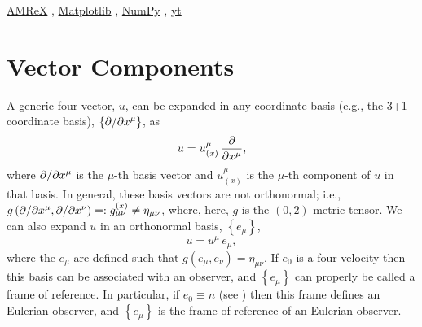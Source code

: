 \href{https://amrex-codes.github.io/}{AMReX}
\citep{zab2019},
\href{https://matplotlib.org/}{Matplotlib}
\citep{h2007},
\href{http://www.numpy.org/}{NumPy}
\citep{hmw2020},
\href{https://yt-project.org/}{yt}
\citep{tso2011}

\appendix

\section{Vector Components}

A generic four-vector, $u$, can be expanded in any coordinate basis
(e.g., the 3+1 coordinate basis),
$\left\{\partial/\partial x^{\mu}\right\}$, as
\begin{equation}
  u=u_{\left(x\right)}^{\mu}\,\frac{\partial}{\partial x^{\mu}},
\end{equation}
where $\partial/\partial x^{\mu}$ is the $\mu$-th basis vector
and $u_{\left(x\right)}^{\mu}$ is the $\mu$-th component of $u$ in
that basis.
In general, these basis vectors are not orthonormal;
i.e., $g\left(\partial/\partial x^{\mu},\partial/\partial x^{\nu}\right)
=:g^{\left(x\right)}_{\mu\nu}\neq\eta_{\mu\nu}$,
where, here, $g$ is the $\left(0,2\right)$ metric tensor.
We can also expand $u$ in an orthonormal basis, $\left\{e_{\mu}\right\}$,
\begin{equation}
  u=u^{\mu}\,e_{\mu},
\end{equation}
where the $e_{\mu}$ are defined such that
$g\left(e_{\mu},e_{\nu}\right)=\eta_{\mu\nu}$.
If $e_{0}$ is a four-velocity then this basis can be associated
with an observer, and $\left\{e_{\mu}\right\}$ can properly
be called a frame of reference.
In particular, if $e_{0}\equiv n$ (see ) then this frame defines
an Eulerian observer, and $\left\{e_{\mu}\right\}$ is the frame of
reference of an Eulerian observer.

